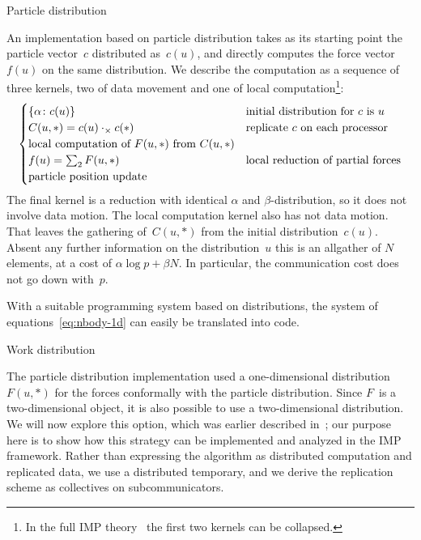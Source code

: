  {Particle distribution}

\def\dottimes{\mathbin{\cdot_\times}}

An implementation based on particle distribution takes as its starting
point the particle vector~$c$ distributed as~$c(u)$, and
directly computes the force vector $f(u)$ on the same distribution.
We describe the
computation as a sequence of three kernels, two of data movement and
one of local computation\footnote{In the full \ac{IMP}
  theory~\cite{Eijkhout:ICCS2012} the first two kernels can be
  collapsed.}:
\begin{equation}
  \begin{cases}
    \{ \alpha\colon c(u) \}&\hbox{initial distribution for $c$ is $u$}\\
    C(u,*) = c(u)\dottimes c(*)&\hbox{replicate $c$ on each processor}\\
    \hbox{local computation of $F(u,*)$ from $C(u,*)$}\\
    f(u) = \sum_2 F(u,*)&\hbox{local reduction of partial forces}\\
    \hbox{particle position update}
  \end{cases}
  \label{eq:nbody-1d}
\end{equation}
The final kernel is a reduction with identical $\alpha$ and
$\beta$-distribution, so it does not involve data motion.
The local computation kernel also has not data motion.
That leaves the gathering of~$C(u,*)$ from the initial
distribution~$c(u)$. Absent any further information on the 
distribution~$u$ this is an allgather of $N$ elements,
at a cost of $\alpha\log p+\beta N$.
In particular, the communication cost does not go down
with~$p$.

With a suitable programming system based on distributions,
the system of equations~\eqref{eq:nbody-1d} can easily be
translated into code.

 {Work distribution}

The particle distribution implementation used a one-dimensional
distribution $F(u,*)$ for the forces conformally with the particle
distribution. Since $F$~is a two-dimensional object, it is also
possible to use a two-dimensional distribution. We will now explore
this option, which was earlier described
in~\cite{Driscoll:optimal-nbody}; our purpose here is to show how this
strategy can be implemented and analyzed in the \ac{IMP} framework.
Rather than expressing the algorithm as
distributed computation and replicated data, we use a
distributed temporary, and we derive the replication scheme
as collectives on subcommunicators. 

